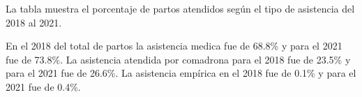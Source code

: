 La tabla muestra el porcentaje de partos atendidos según el tipo de asistencia del 2018 al 2021. 

En el 2018 del total de partos la asistencia medica fue de 68.8\% y para el 2021 fue de 73.8\%. La asistencia atendida por comadrona para el 2018 fue de 23.5\% y para el 2021 fue de 26.6\%. La asistencia empírica en el 2018 fue de 0.1\%  y para el 2021 fue de 0.4\%. 